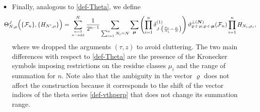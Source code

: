\documentclass[12pt,letterpaper]{JHEP3}
\def\be{\begin{equation}}
\def\ee{\end{equation}}
\def\({\left(}
\def\){\right)}
\newcommand{\vth}{\vartheta}
\def\vrh{\varrho}
\newcommand{\veps}{\varepsilon}
\newcommand{\cF}{\mathcal{F}}
\newcommand{\bfN}{{\boldsymbol N}}
\newcommand{\bfmu}{{\boldsymbol \mu}}
\def\vth{\vartheta}
\begin{document}
\begin{itemize}
\item
Finally, analogous to \eqref{def-Theta}, we define 
\be 
\hspace{-0.5cm}
\Theta^J_{N,\mu}\Bigl(\{\cF_n\},\{H_{N',\mu}\}\Bigr)=
\sum_{n=3\atop n{\rm -odd}}^N \frac{1}{2^{n-1}}\sum_{\sum_{i=1}^n N_i=N}\sum_{\bfmu}
\(\prod_{i=1}^n\delta^{(1)}_{J\cdot \bigl(\frac{\mu_i}{N_i}-\frac{\mu}{N}\bigr)}\)
\vth^{\perp(\bfN)}_{\vrh\cdot\veps\cdot\mu,\vrh\cdot\veps\cdot\bfmu}(\cF_n)
\prod_{i=1}^n H_{N_i,\mu_i},
\label{def-Theta-perp}
\ee 
where we dropped the arguments $(\tau,z)$ to avoid cluttering.
The two main differences with respect to \eqref{def-Theta}
are the presence of the Kronecker symbols imposing restrictions on the residue classes $\mu_i$ and the range of summation for $n$.
Note also that the ambiguity in the vector $\vrh$ does not affect the construction because it corresponds to the shift of 
the vector indices of the theta series \eqref{def-vthperp} that does not change its summation range.

\end{itemize}
\end{document}

